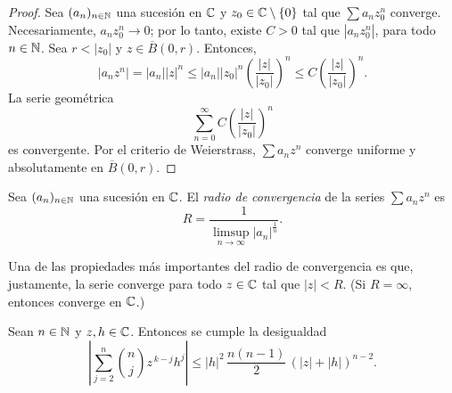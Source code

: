 \begin{proof}
    Sea $(a_n)_{n \in \mathbb{N}}$ una sucesión en $\mathbb{C}$ y $z_0 \in \mathbb{C} \setminus \{0\}$ tal que $\sum a_n z_0^n$ converge. Necesariamente, $a_n z_0^n \to 0$; por lo tanto, existe $C > 0$ tal que $|a_n z_0^n|$, para todo $n \in \mathbb{N}$. Sea $r < |z_0|$ y $z \in \overline{B}(0, r)$. Entonces,
    \begin{equation*}
        |a_n z^n| = |a_n| |z|^n \leq |a_n| |z_0|^n \left( \frac{|z|}{|z_0|} \right)^n \leq C \left( \frac{|z|}{|z_0|} \right)^n.
    \end{equation*}
    La serie geométrica
    \begin{equation*}
       \sum_{n=0}^{\infty} C \left( \frac{|z|}{|z_0|} \right)^n
    \end{equation*}
    es convergente. Por el criterio de Weierstrass, $\sum a_n z^n$ converge uniforme y absolutamente en $\overline{B}(0, r)$.
\end{proof}

\begin{definition}
    Sea $(a_n)_{n \in \mathbb{N}}$ una sucesión en $\mathbb{C}$. El \emph{radio de convergencia} de la series $\sum a_n z^n$ es
    \begin{equation*}
        R = \frac{1}{\limsup_{n \to \infty} |a_n|^{\frac{1}{n}}}.
    \end{equation*}
\end{definition}

Una de las propiedades más importantes del radio de convergencia es que, justamente, la serie converge para todo $z \in \mathbb{C}$ tal que $|z| < R$. (Si $R = \infty$, entonces converge en $\mathbb{C}$.)

\begin{lemma}
    \label{lem:desig-binom}
    Sean $n \in \mathbb{N}$ y $z, h \in \mathbb{C}$. Entonces se cumple la desigualdad
    \begin{equation*}
        \left| \sum_{j=2}^{n} \binom{n}{j} z^{\,k-j} h^j \right|
        \leq |h|^2 \, \frac{n(n-1)}{2} \, (|z|+|h|)^{n-2}.
    \end{equation*}
\end{lemma}

